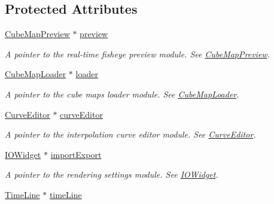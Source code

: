 \subsection*{\-Protected \-Attributes}
\begin{DoxyCompactItemize}
\item 
\hypertarget{class_main_widget_a9eca77d69ccf6c2d70f4eea335b6e30c}{
\hyperlink{class_cube_map_preview}{\-Cube\-Map\-Preview} $\ast$ \hyperlink{class_main_widget_a9eca77d69ccf6c2d70f4eea335b6e30c}{preview}}
\label{class_main_widget_a9eca77d69ccf6c2d70f4eea335b6e30c}

\begin{DoxyCompactList}\small\item\em \-A pointer to the real-\/time fisheye preview module. \-See \hyperlink{class_cube_map_preview}{\-Cube\-Map\-Preview}. \end{DoxyCompactList}\item 
\hypertarget{class_main_widget_a6eb8e8f4d3a39e7ee0a4bc1775086437}{
\hyperlink{class_cube_map_loader}{\-Cube\-Map\-Loader} $\ast$ \hyperlink{class_main_widget_a6eb8e8f4d3a39e7ee0a4bc1775086437}{loader}}
\label{class_main_widget_a6eb8e8f4d3a39e7ee0a4bc1775086437}

\begin{DoxyCompactList}\small\item\em \-A pointer to the cube maps loader module. \-See \hyperlink{class_cube_map_loader}{\-Cube\-Map\-Loader}. \end{DoxyCompactList}\item 
\hypertarget{class_main_widget_aeb9523ae4024fa33c969ccef6ca52db2}{
\hyperlink{class_curve_editor}{\-Curve\-Editor} $\ast$ \hyperlink{class_main_widget_aeb9523ae4024fa33c969ccef6ca52db2}{curve\-Editor}}
\label{class_main_widget_aeb9523ae4024fa33c969ccef6ca52db2}

\begin{DoxyCompactList}\small\item\em \-A pointer to the interpolation curve editor module. \-See \hyperlink{class_curve_editor}{\-Curve\-Editor}. \end{DoxyCompactList}\item 
\hypertarget{class_main_widget_a46b4339b130ae53c8312121c452da407}{
\hyperlink{class_i_o_widget}{\-I\-O\-Widget} $\ast$ \hyperlink{class_main_widget_a46b4339b130ae53c8312121c452da407}{import\-Export}}
\label{class_main_widget_a46b4339b130ae53c8312121c452da407}

\begin{DoxyCompactList}\small\item\em \-A pointer to the rendering settings module. \-See \hyperlink{class_i_o_widget}{\-I\-O\-Widget}. \end{DoxyCompactList}\item 
\hypertarget{class_main_widget_a67a259e93772471f1007a4ae305c8863}{
\hyperlink{class_time_line}{\-Time\-Line} $\ast$ \hyperlink{class_main_widget_a67a259e93772471f1007a4ae305c8863}{time\-Line}}
\label{class_main_widget_a67a259e93772471f1007a4ae305c8863}


\end{DoxyCompactItemize}
